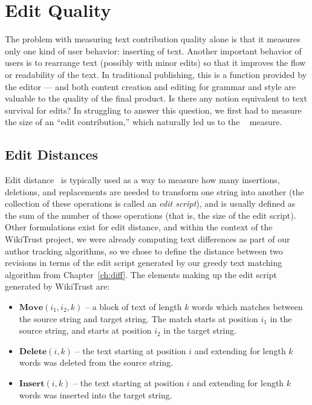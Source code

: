 \section{Edit Quality}
\label{sec:editquality}

The problem with measuring text contribution quality alone is that it
measures only one kind of user behavior: inserting of text.
Another important behavior of users is to rearrange text
(possibly with minor edits) so that it improves the flow or
readability of the text.
In traditional publishing, this is a function provided by the
editor --- and both content creation and editing for grammar and
style are valuable to the quality of the final product.
Is there any notion equivalent to text survival for edits?
In struggling to answer this question, we first had to measure
the size of an ``edit contribution,'' which naturally led us to the
~\cite{Damerau1964,Levenshtein1966,Tichy1984,Cormode2007,Sankoff1999}
measure.

\subsection{Edit Distances}
\label{sec:eq-distances}

Edit distance~\cite{Damerau1964,Levenshtein1966} is typically used as a way to
measure how many insertions, deletions, and replacements are needed to
transform one string into another (the collection of these operations
is called an \textit{edit script}), and is usually defined as the sum of the
number of those operations (that is, the size of the edit script).
Other formulations exist for edit distance, and within the
context of the WikiTrust project, we were already computing
text differences as part of our author tracking algorithms,
so we chose to define the distance between two revisions
in terms of the edit script generated by our greedy text
matching algorithm from Chapter~\ref{ch:diff}.
The elements making up the edit script generated by WikiTrust are:
\begin{itemize}
\item $\mathbf{Move}(i_1, i_2, k)$ -- a block of text of
    length $k$ words which matches between the source string
    and target string.
    The match starts at position $i_1$ in the source string,
    and starts at position $i_2$ in the target string.
\item $\mathbf{Delete}(i, k)$ -- the text starting at position $i$
    and extending for length $k$ words was deleted from the source string.
\item $\mathbf{Insert}(i, k)$ -- the text starting at position $i$
    and extending for length $k$ words was inserted into the target string.
\end{itemize}


